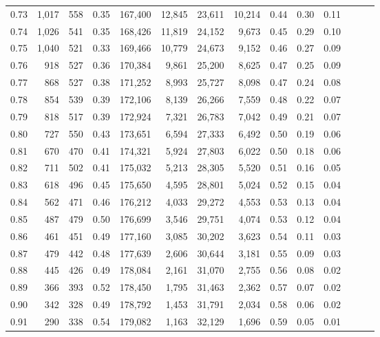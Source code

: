 \begin{tabular}{rrrrrrrrrrrrrr}
0.73 &  1,017 &  558 &  0.35 &  167,400 &   12,845 &  23,611 &  10,214 &  0.44 &  0.30 &      0.11 \\
0.74 &  1,026 &  541 &  0.35 &  168,426 &   11,819 &  24,152 &   9,673 &  0.45 &  0.29 &      0.10 \\
0.75 &  1,040 &  521 &  0.33 &  169,466 &   10,779 &  24,673 &   9,152 &  0.46 &  0.27 &      0.09 \\
0.76 &    918 &  527 &  0.36 &  170,384 &    9,861 &  25,200 &   8,625 &  0.47 &  0.25 &      0.09 \\
0.77 &    868 &  527 &  0.38 &  171,252 &    8,993 &  25,727 &   8,098 &  0.47 &  0.24 &      0.08 \\
0.78 &    854 &  539 &  0.39 &  172,106 &    8,139 &  26,266 &   7,559 &  0.48 &  0.22 &      0.07 \\
0.79 &    818 &  517 &  0.39 &  172,924 &    7,321 &  26,783 &   7,042 &  0.49 &  0.21 &      0.07 \\
0.80 &    727 &  550 &  0.43 &  173,651 &    6,594 &  27,333 &   6,492 &  0.50 &  0.19 &      0.06 \\
0.81 &    670 &  470 &  0.41 &  174,321 &    5,924 &  27,803 &   6,022 &  0.50 &  0.18 &      0.06 \\
0.82 &    711 &  502 &  0.41 &  175,032 &    5,213 &  28,305 &   5,520 &  0.51 &  0.16 &      0.05 \\
0.83 &    618 &  496 &  0.45 &  175,650 &    4,595 &  28,801 &   5,024 &  0.52 &  0.15 &      0.04 \\
0.84 &    562 &  471 &  0.46 &  176,212 &    4,033 &  29,272 &   4,553 &  0.53 &  0.13 &      0.04 \\
0.85 &    487 &  479 &  0.50 &  176,699 &    3,546 &  29,751 &   4,074 &  0.53 &  0.12 &      0.04 \\
0.86 &    461 &  451 &  0.49 &  177,160 &    3,085 &  30,202 &   3,623 &  0.54 &  0.11 &      0.03 \\
0.87 &    479 &  442 &  0.48 &  177,639 &    2,606 &  30,644 &   3,181 &  0.55 &  0.09 &      0.03 \\
0.88 &    445 &  426 &  0.49 &  178,084 &    2,161 &  31,070 &   2,755 &  0.56 &  0.08 &      0.02 \\
0.89 &    366 &  393 &  0.52 &  178,450 &    1,795 &  31,463 &   2,362 &  0.57 &  0.07 &      0.02 \\
0.90 &    342 &  328 &  0.49 &  178,792 &    1,453 &  31,791 &   2,034 &  0.58 &  0.06 &      0.02 \\
0.91 &    290 &  338 &  0.54 &  179,082 &    1,163 &  32,129 &   1,696 &  0.59 &  0.05 &      0.01 \\

\end{tabular}
